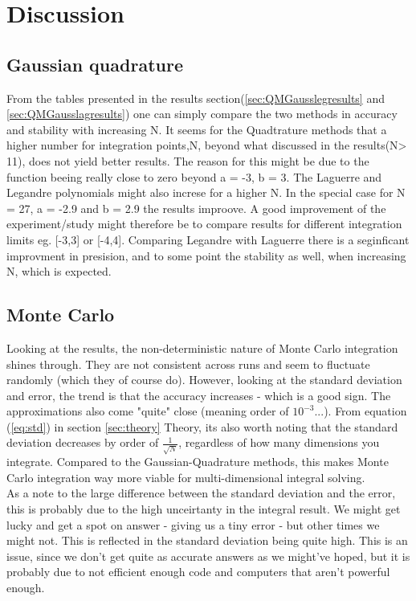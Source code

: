 \documentclass[../main.tex]{subfiles}
\begin{document}
\section{Discussion}
\subsection{Gaussian quadrature}
From the tables presented in the results section(\ref{sec:QMGausslegresults} and \ref{sec:QMGausslagresults}) one can simply compare the two methods in accuracy and stability with increasing N. It seems for the Quadtrature methods that a higher number for integration points,N, beyond what discussed in the results(N> 11), does not yield better results. The reason for this might be due to the function beeing really close to zero beyond a  = -3, b = 3. The Laguerre and Legandre polynomials might also increse for a higher N. In the special case for N = 27, a = -2.9 and b = 2.9 the results improove. A good improvement of the experiment/study might therefore be to compare results for different integration limits eg. [-3,3] or [-4,4].
Comparing Legandre with Laguerre there is a seginficant improvment in presision, and to some point the stability as well, when increasing N, which is expected.

\subsection{Monte Carlo}
Looking at the results, the non-deterministic nature of Monte Carlo integration shines through. They are not consistent across runs and seem to fluctuate randomly (which they of course do). However, looking at the standard deviation and error, the trend is that the accuracy increases - which is a good sign. The approximations also come "quite" close (meaning order of $10^{-3}$...). From equation (\ref{eq:std}) in section \ref{sec:theory} Theory, its also worth noting that the standard deviation decreases by order of $\frac{1}{\sqrt{N}}$, regardless of how many dimensions you integrate. Compared to the Gaussian-Quadrature methods, this makes Monte Carlo integration way more viable for multi-dimensional integral solving. \\

As a note to the large difference between the standard deviation and the error, this is probably due to the high unceirtanty in the integral result. We might get lucky and get a spot on answer - giving us a tiny error - but other times we might not. This is reflected in the standard deviation being quite high. This is an issue, since we don't get quite as accurate answers as we might've hoped, but it is probably due to not efficient enough code and computers that aren't powerful enough.
\end{document}
